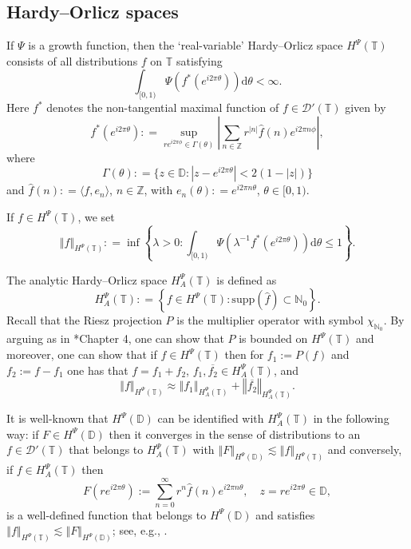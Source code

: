 \documentclass[a4paper, leqno, 10pt]{amsart}
\numberwithin{equation}{section}
\newcommand{\dd}{\mathrm{d}}
\newcommand{\T}{\mathbb{T}}
\newcommand{\norm}[1]{\left\Vert#1\right\Vert}
\newcommand{\brkt}[1]{\left(#1\right)}
\newcommand{\abs}[1]{\left|#1\right|}
\newcommand{\D}{\mathbb{D}}
\newcommand{\Z}{\mathbb{Z}}
\newcommand{\N}{\mathbb{N}}
\begin{document}
\subsection{Hardy--Orlicz spaces}

If $\Psi$ is a growth function, then the `real-variable' Hardy--Orlicz space $H^{\Psi} (\T)$ consists of all distributions $f$ on $\T$ satisfying
\[
\int_{[0,1)} \Psi \brkt{ f^{\ast} ( e^{ i 2 \pi \theta} ) } \dd \theta < \infty. 
\]
Here $f^{\ast}$ denotes the non-tangential maximal function of $f \in \mathcal{D}' (\T)$ given by
\[
f^{\ast} (  e^{ i 2 \pi \theta}  ) : = \sup_{r e^{i 2 \pi \phi} \in \Gamma (  \theta ) } \abs{ \sum_{n \in \Z} r^{|n|} \widehat{f}(n) e^{i 2 \pi n \phi} } , 
\]
where \[\Gamma ( \theta ) : = \{ z \in \D : |z - e^{i 2 \pi \theta }| < 2 (1-|z|) \} \] and $ \widehat{f} (n) : = \langle f, e_n \rangle$, $n \in \Z$, with $e_n (\theta) : = e^{i 2 \pi n \theta}$, $\theta \in [0,1)$. 

If $f \in H^{\Psi} (\T)$, we set
\[
\norm{f}_{H^{\Psi} (\T)} : = \inf \left\{ \lambda > 0 :   \int_{[0, 1)} \Psi \brkt{ \lambda^{-1}   f^{\ast} ( e^{ i 2 \pi \theta} ) }  \dd \theta   \leq 1 \right\}  . 
\]

The analytic Hardy--Orlicz space $H^{\Psi}_A (\T)$ is defined as
\[
H^{\Psi}_A (\T) : = \left\{ f \in H^{\Psi} (\T):  \mathrm{supp} \brkt{ \widehat{f} } \subset \N_0 \right\} . 
\]
Recall that the Riesz projection $P$ is the multiplier operator with symbol $\chi_{\N_0}$. By arguing as in \cite{YLK}*{Chapter 4}, one can show that $P$ is bounded on $H^{\Psi} (\T)$ and moreover, one can show that if $f \in H^{\Psi} (\T)$ then for $f_1 := P (f) $ and $f_2 := f - f_1$ one has that $f = f_1 + f_2$, $f_1, \overline{f_2} \in H^{\Psi}_A (\T)$, and
\begin{equation}\label{norm_equiv}
 \norm{f}_{H^{\Psi} (\T)} \approx \norm{f_1}_{H^{\Psi}_A (\T)} +  \norm{\overline{f_2}}_{H^{\Psi}_A (\T)}. 
\end{equation}

It is well-known that $H^{\Psi} (\D)$ can be identified with $H^{\Psi}_A (\T)$ in the following way: if $F \in H^{\Psi} (\D)$ then it converges in the sense of distributions to an $f  \in \mathcal{D}' (\T)
$ that belongs to $H^{\Psi}_A (\T)$ with $\norm{F}_{H^{\Psi} (\D)} \lesssim  \norm{f}_{H^{\Psi} (\T)}$ and conversely, if $f \in H^{\Psi}_A (\T)$ then  
\[
F(r e^{i2 \pi \theta}) := \sum_{n=0}^{\infty} r^n \widehat{f} (n) e^{i 2 \pi n \theta}, \quad z = r e^{i2 \pi \theta} \in \D, \]
is a well-defined function that belongs to $H^{\Psi} (\D)$ and satisfies $\norm{f}_{H^{\Psi} (\T)} \lesssim  \norm{F}_{H^{\Psi} (\D)}$; see, e.g., \cite{BG}. 
    
\end{document}
